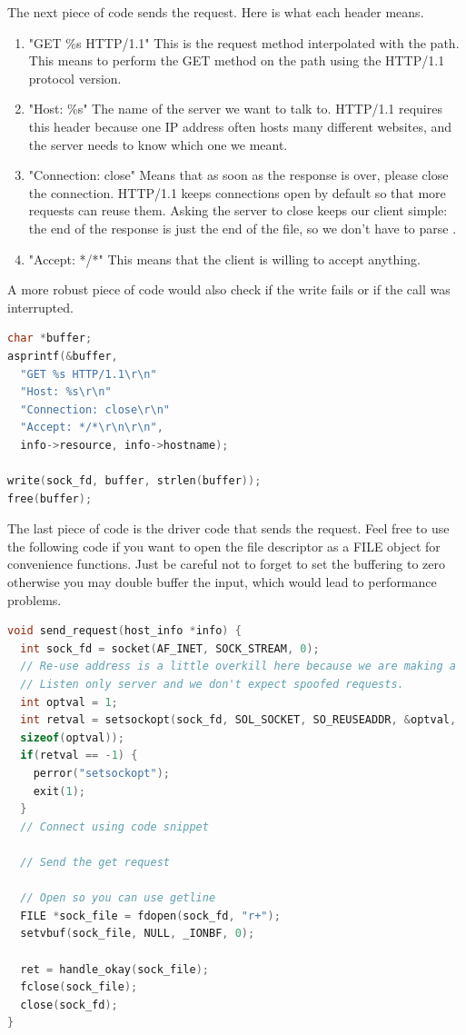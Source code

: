 The next piece of code sends the request. Here is what each header means.

\begin{enumerate}
  \item "GET \%s HTTP/1.1" This is the request method interpolated with the path. This means to perform the GET method on the path using the HTTP/1.1 protocol version.
  \item "Host: \%s" The name of the server we want to talk to.
    HTTP/1.1 requires this header because one IP address often hosts many different websites, and the server needs to know which one we meant.
  \item "Connection: close" Means that as soon as the response is over, please close the connection.
    HTTP/1.1 keeps connections open by default so that more requests can reuse them.
    Asking the server to close keeps our client simple: the end of the response is just the end of the file, so we don't have to parse .
  \item "Accept: */*" This means that the client is willing to accept anything.
\end{enumerate}

A more robust piece of code would also check if the write fails or if the call was interrupted.

\begin{lstlisting}[language=C]
char *buffer;
asprintf(&buffer,
  "GET %s HTTP/1.1\r\n"
  "Host: %s\r\n"
  "Connection: close\r\n"
  "Accept: */*\r\n\r\n",
  info->resource, info->hostname);

write(sock_fd, buffer, strlen(buffer));
free(buffer);
\end{lstlisting}

The last piece of code is the driver code that sends the request.
Feel free to use the following code if you want to open the file descriptor as a FILE object for convenience functions.
Just be careful not to forget to set the buffering to zero otherwise you may double buffer the input, which would lead to performance problems.

\begin{lstlisting}[language=C]
void send_request(host_info *info) {
  int sock_fd = socket(AF_INET, SOCK_STREAM, 0);
  // Re-use address is a little overkill here because we are making a
  // Listen only server and we don't expect spoofed requests.
  int optval = 1;
  int retval = setsockopt(sock_fd, SOL_SOCKET, SO_REUSEADDR, &optval,
  sizeof(optval));
  if(retval == -1) {
    perror("setsockopt");
    exit(1);
  }
  // Connect using code snippet

  // Send the get request

  // Open so you can use getline
  FILE *sock_file = fdopen(sock_fd, "r+");
  setvbuf(sock_file, NULL, _IONBF, 0);

  ret = handle_okay(sock_file);
  fclose(sock_file);
  close(sock_fd);
}
\end{lstlisting}

